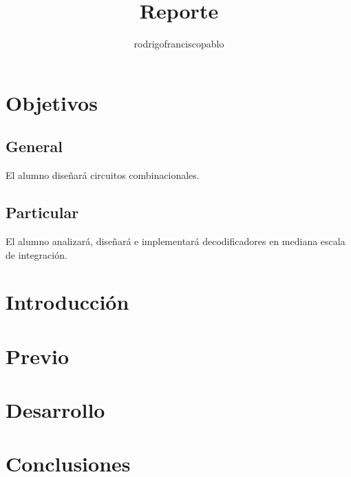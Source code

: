 \documentclass{mylib/reporteConCalif}
\title{Reporte}
\author{rodrigofranciscopablo }
\begin{document}
\coverPage

\section{Objetivos}

\subsection{General}

El alumno diseñará circuitos combinacionales.

\subsection{Particular}

El alumno analizará, diseñará e implementará decodificadores en mediana escala de integración.

\section{Introducción}


\newpage
\section{Previo}

\newpage
\section{Desarrollo}


\section{Conclusiones}
\end{document}
